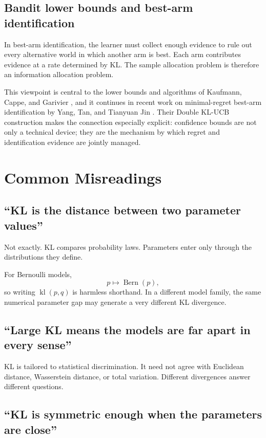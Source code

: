 \documentclass[en,nofont,11pt]{elegantbook}
\newcommand{\kl}{\operatorname{kl}}
\newcommand{\Ber}{\operatorname{Bern}}
\begin{document}
\section{Bandit lower bounds and best-arm identification}

In best-arm identification, the learner must collect enough evidence to rule out every alternative world in which another arm is best. Each arm contributes evidence at a rate determined by KL. The sample allocation problem is therefore an information allocation problem.

This viewpoint is central to the lower bounds and algorithms of Kaufmann, Cappe, and Garivier \cite{kaufmann2016complexity}, and it continues in recent work on minimal-regret best-arm identification by Yang, Tan, and Tianyuan Jin \cite{yang2024minimal}. Their Double KL-UCB construction makes the connection especially explicit: confidence bounds are not only a technical device; they are the mechanism by which regret and identification evidence are jointly managed.

\chapter{Common Misreadings}

\section{``KL is the distance between two parameter values''}

Not exactly. KL compares probability laws. Parameters enter only through the distributions they define.

For Bernoulli models,
\[
p\mapsto\Ber(p),
\]
so writing $\kl(p,q)$ is harmless shorthand. In a different model family, the same numerical parameter gap may generate a very different KL divergence.

\section{``Large KL means the models are far apart in every sense''}

KL is tailored to statistical discrimination. It need not agree with Euclidean distance, Wasserstein distance, or total variation. Different divergences answer different questions.

\section{``KL is symmetric enough when the parameters are close''}
\end{document}

